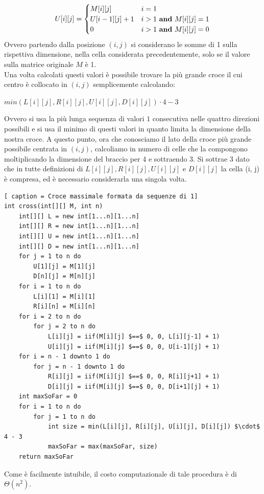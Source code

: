 \documentclass[../cheatSheetAlgoritmi.tex]{subfiles}
\begin{document}
\begin{equation*}
  	U[i][j] =\begin{cases}
    	M[i][j] & \text{$i = 1$}\\
    	U[i-1][j] + 1 & \text{$i > 1$ \textbf{and} $M[i][j] = 1$}\\
    	0 & \text{$i > 1$ \textbf{and} $M[i][j] = 0$}
  	\end{cases}
\end{equation*}
Ovvero partendo dalla posizione $(i, j)$ si considerano le somme di 1 sulla rispettiva dimensione, nella cella considerata precedentemente, solo se il valore sulla matrice originale $M$ è 1. \\
Una volta calcolati questi valori è possibile trovare la più grande croce il cui centro è collocato in $(i, j)$ semplicemente calcolando: 
\begin{center}
$min(L[i][j], R[i][j], U[i][j], D[i][j]) \cdot 4 - 3$
\end{center}
Ovvero si usa la più lunga sequenza di valori $1$ consecutiva nelle quattro direzioni possibili e si usa il minimo di questi valori in quanto limita la dimensione della nostra croce. A questo punto, ora che conosciamo il lato della croce più grande possibile centrata in $(i, j)$, calcoliamo in numero di celle che la compongono moltiplicando la dimensione del braccio per 4 e sottraendo 3. Si sottrae 3 dato che in tutte definizioni di $L[i][j], R[i][j], U[i][j]$ e $D[i][j]$ la cella (i, j) è compresa, ed è necessario considerarla una singola volta.
\begin{lstlisting}[ caption = Croce massimale formata da sequenze di 1]
int cross(int[][] M, int n)
	int[][] L = new int[1...n][1...n]
	int[][] R = new int[1...n][1...n]
	int[][] U = new int[1...n][1...n]
	int[][] D = new int[1...n][1...n]
	for j = 1 to n do
		U[1][j] = M[1][j]
		D[n][j] = M[n][j]
	for i = 1 to n do
		L[i][1] = M[i][1]
		R[i][n] = M[i][n]
	for i = 2 to n do
		for j = 2 to n do
			L[i][j] = iif(M[i][j] $==$ 0, 0, L[i][j-1] + 1)
			U[i][j] = iif(M[i][j] $==$ 0, 0, U[i-1][j] + 1)
	for i = n - 1 downto 1 do
		for j = n - 1 downto 1 do
			R[i][j] = iif(M[i][j] $==$ 0, 0, R[i][j+1] + 1)
			D[i][j] = iif(M[i][j] $==$ 0, 0, D[i+1][j] + 1)
	int maxSoFar = 0
	for i = 1 to n do
		for j = 1 to n do
			int size = min(L[i][j], R[i][j], U[i][j], D[i][j]) $\cdot$ 4 - 3
			maxSoFar = max(maxSoFar, size)
	return maxSoFar
\end{lstlisting}
Come è facilmente intuibile, il costo computazionale di tale procedura è di $\Theta(n^2)$.
\newpage
\end{document}
